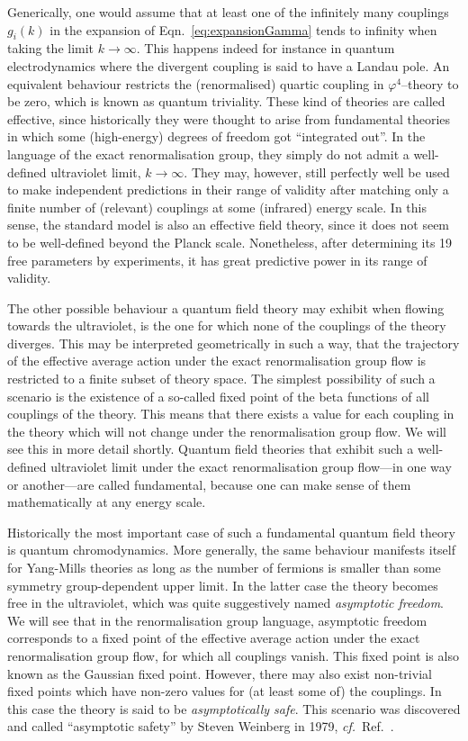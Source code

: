 \documentclass[11pt]{book}
\newcommand\cf{\textit{cf.}\ }
\numberwithin{equation}{chapter}
\begin{document}
Generically, one would assume that at least one of the infinitely
many couplings $g_i(k)$ in the expansion of
Eqn.~\eqref{eq:expansionGamma} tends to infinity when taking
the limit $k \rightarrow \infty$. This happens indeed for instance
in quantum electrodynamics where the divergent coupling is said to have a
Landau pole. An equivalent behaviour restricts the
(renormalised) quartic coupling in $\varphi^4$--theory to be zero,
which is known as quantum triviality. These kind of theories
are called effective, since historically they were thought to
arise from fundamental theories in which some (high-energy)
degrees of freedom got ``integrated out''. In the language of the
exact renormalisation group, they simply do not admit a
well-defined ultraviolet limit, $k \rightarrow \infty$.
They may, however, still perfectly well be used to make
independent predictions in their range of validity
after matching only a finite number of (relevant) couplings
at some (infrared) energy scale.
In this sense, the standard model is also an effective field
theory, since it does not seem to be well-defined beyond the
Planck scale. Nonetheless, after determining its 19 free
parameters by experiments, it has great predictive power in
its range of validity.

The other possible behaviour a quantum field theory
may exhibit when flowing towards the ultraviolet,
is the one for which none of the couplings of the theory
diverges. This may be interpreted geometrically in such a way,
that the trajectory
of the effective average action under the exact renormalisation
group flow is restricted to a finite subset of theory space.
The simplest possibility of such a scenario is the existence
of a so-called fixed point of the beta functions of all couplings
of the theory. This means that there exists a value
for each coupling in the theory which will not
change under the renormalisation group flow.
We will see this in more detail shortly. Quantum field
theories that exhibit such a well-defined ultraviolet
limit under the exact renormalisation group flow---in one way or
another---are called fundamental, because one can make sense of
them mathematically at any energy scale.

Historically the most important case of such a fundamental quantum
field theory is quantum chromodynamics. More generally,
the same behaviour manifests itself for Yang-Mills theories as long as the
number of fermions is smaller than some symmetry group-dependent
upper limit. In the latter case the theory becomes free
in the ultraviolet, which was quite suggestively named
\textit{asymptotic freedom}. We will see that
in the renormalisation group language,
asymptotic freedom corresponds to a fixed
point of the effective average action
under the exact renormalisation group flow,
for which all couplings vanish.
This fixed point is also known as the Gaussian fixed point.
However, there may also exist non-trivial fixed points
which have non-zero values for (at least some of) the couplings.
In this case the theory is said to be \textit{asymptotically safe}.
This scenario was discovered and called ``asymptotic safety''
by Steven Weinberg in 1979, \cf Ref.~\cite{Weinberg:1980gg}.
\end{document}
